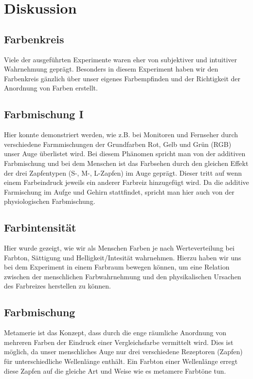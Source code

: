 \documentclass[a4paper]{article}
\begin{document}

\newpage
\section{Diskussion}

 \subsection{Farbenkreis}
Viele der ausgeführten Experimente waren eher von subjektiver und intuitiver Wahrnehmung geprägt. Besonders in diesem Experiment haben wir den Farbenkreis gänzlich über unser eigenes Farbempfinden und der Richtigkeit der Anordnung von Farben erstellt. 

 \subsection{Farbmischung I}
 
Hier konnte demonstriert werden, wie z.B. bei Monitoren und Fernseher durch verschiedene Farmmischungen der Grundfarben Rot, Gelb und Grün (RGB) unser Auge überlistet wird. Bei diesem Phänomen spricht man von der additiven Farbmischung und bei dem Menschen ist das Farbsehen durch den gleichen Effekt der drei Zapfentypen (S-, M-, L-Zapfen) im Auge geprägt. Dieser tritt auf wenn einem Farbeindruck jeweils ein anderer Farbreiz hinzugefügt wird. Da die additive Farmischung im Aufge und Gehirn stattfindet, spricht man hier auch von der physiologischen Farbmischung.

 \subsection{Farbintensität}
 Hier wurde gezeigt, wie wir als Menschen Farben je nach Werteverteilung bei Farbton, Sättigung und Helligkeit/Intesität wahrnehmen. Hierzu haben wir uns bei dem Experiment in einem Farbraum bewegen können, um eine Relation zwischen der menschlichen Farbwahrnehmung und den physikalischen Ursachen des Farbreizes herstellen zu können.

\subsection{Farbmischung}
Metamerie ist das Konzept, dass durch die enge räumliche Anordnung von mehreren Farben der Eindruck einer Vergleichsfarbe vermittelt wird. Dies ist möglich, da unser menschliches Auge nur drei verschiedene Rezeptoren (Zapfen) für unterschiedliche Wellenlänge enthält. Ein Farbton einer Wellenlänge erregt diese Zapfen auf die gleiche Art und Weise wie es metamere Farbtöne tun.
\end{document}
